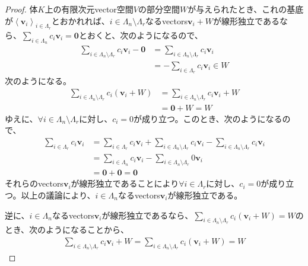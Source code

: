 \documentclass[dvipdfmx]{jsarticle}
\begin{document}
\begin{proof}
体$K$上の有限次元vector空間$V$の部分空間$W$が与えられたとき、これの基底が$\left\langle \mathbf{v}_{i} \right\rangle_{i \in \varLambda_{r}}$とおかれれば、$i \in \varLambda_{n} \setminus \varLambda_{r}$なるvectors$\mathbf{v}_{i} + W$が線形独立であるなら、$\sum_{i \in \varLambda_{n}} {c_{i}\mathbf{v}_{i}} = \mathbf{0}$とおくと、次のようになるので、
\begin{align*}
\sum_{i \in \varLambda_{n} \setminus \varLambda_{r}} {c_{i}\mathbf{v}_{i}} - \mathbf{0} &= \sum_{i \in \varLambda_{n} \setminus \varLambda_{r}} {c_{i}\mathbf{v}_{i}}\\
&= - \sum_{i \in \varLambda_{r}} {c_{i}\mathbf{v}_{i}} \in W
\end{align*}
次のようになる。
\begin{align*}
\sum_{i \in \varLambda_{n} \setminus \varLambda_{r}} {c_{i}\left( \mathbf{v}_{i} + W \right)} &= \sum_{i \in \varLambda_{n} \setminus \varLambda_{r}} {c_{i}\mathbf{v}_{i}} + W\\
&= \mathbf{0} + W = W
\end{align*}
ゆえに、$\forall i \in \varLambda_{n} \setminus \varLambda_{r}$に対し、$c_{i} = 0$が成り立つ。このとき、次のようになるので、
\begin{align*}
\sum_{i \in \varLambda_{r}} {c_{i}\mathbf{v}_{i}} &= \sum_{i \in \varLambda_{r}} {c_{i}\mathbf{v}_{i}} + \sum_{i \in \varLambda_{n} \setminus \varLambda_{r}} {c_{i}\mathbf{v}_{i}} - \sum_{i \in \varLambda_{n} \setminus \varLambda_{r}} {c_{i}\mathbf{v}_{i}}\\
&= \sum_{i \in \varLambda_{n}} {c_{i}\mathbf{v}_{i}} - \sum_{i \in \varLambda_{n} \setminus \varLambda_{r}} {0\mathbf{v}_{i}}\\
&= \mathbf{0} + \mathbf{0} = \mathbf{0}
\end{align*}
それらのvectors$\mathbf{v}_{i}$が線形独立であることにより$\forall i \in \varLambda_{r}$に対し、$c_{i} = 0$が成り立つ。以上の議論により、$i \in \varLambda_{n}$なるvectors$\mathbf{v}_{i}$が線形独立である。\par
逆に、$i \in \varLambda_{n}$なるvectors$\mathbf{v}_{i}$が線形独立であるなら、$\sum_{i \in \varLambda_{n} \setminus \varLambda_{r}} {c_{i}\left( \mathbf{v}_{i} + W \right)} = W$のとき、次のようになることから、
\begin{align*}
\sum_{i \in \varLambda_{n} \setminus \varLambda_{r}} {c_{i}\mathbf{v}_{i}} + W = \sum_{i \in \varLambda_{n} \setminus \varLambda_{r}} {c_{i}\left( \mathbf{v}_{i} + W \right)} = W
\end{align*}

\end{proof}
\end{document}
